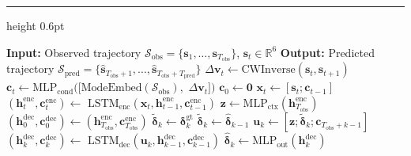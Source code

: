 \documentclass[a4paper,fleqn]{cas-dc}
\begin{document}
\noindent
\begin{minipage}{\columnwidth}
    \hrule height 0.6pt
    \vspace{3pt}
    \small
    \begin{algorithmic}[1]
        \State \textbf{Input:} Observed trajectory $\mathcal{S}_{\text{obs}} = \{\bm{s}_1, \dots, \bm{s}_{T_{\text{obs}}}\}$, $\bm{s}_t \in \mathbb{R}^{6}$
        \State \textbf{Output:} Predicted trajectory $\mathcal{S}_{\text{pred}} = \{\hat{\bm{s}}_{T_{\text{obs}}+1}, \dots, \hat{\bm{s}}_{T_{\text{obs}}+T_{\text{pred}}}\}$
        \State {}
        \State $\Delta\bm{v}_t \gets \text{CWInverse}(\bm{s}_t, \bm{s}_{t+1})$\label{alg:dv_est}
        \State $\bm{c}_t \gets \text{MLP}_{\text{cond}}([\text{ModeEmbed}(\mathcal{S}_{\text{obs}}),$
                        \Statex \hspace*{2em} $\Delta\bm{v}_t])$\label{alg:cond}
        \EndFor
        \State $\bm{c}_0 \gets \bm{0}$  
        \State {}
        \State $\bm{x}_t \gets [\bm{s}_t; \bm{c}_{t-1}]$\label{alg:ext_input}
        \State $(\bm{h}_t^{\text{enc}}, \bm{c}_t^{\text{enc}}) \gets$
        \Statex \hspace*{2em} $\text{LSTM}_{\text{enc}}(\bm{x}_t, \bm{h}_{t-1}^{\text{enc}}, \bm{c}_{t-1}^{\text{enc}})$\label{alg:encode}
        \EndFor
        \State $\bm{z} \gets \text{MLP}_{\text{ctx}}(\bm{h}_{T_{\text{obs}}}^{\text{enc}})$  
        \State $(\bm{h}_0^{\text{dec}}, \bm{c}_0^{\text{dec}}) \gets (\bm{h}_{T_{\text{obs}}}^{\text{enc}}, \bm{c}_{T_{\text{obs}}}^{\text{enc}})$
        \State {}
        \State $\tilde{\bm{\delta}}_k \gets \bm{\delta}_k^{\text{gt}}$\label{alg:teacher}
        \Else
        \State $\tilde{\bm{\delta}}_k \gets \hat{\bm{\delta}}_{k-1}$
        \EndIf
        \State $\bm{u}_k \gets [\bm{z}; \tilde{\bm{\delta}}_k; \bm{c}_{T_{\text{obs}}+k-1}]$\label{alg:dec_input}
        \State $(\bm{h}_k^{\text{dec}}, \bm{c}_k^{\text{dec}}) \gets$
        \Statex \hspace*{2em} $\text{LSTM}_{\text{dec}}(\bm{u}_k, \bm{h}_{k-1}^{\text{dec}}, \bm{c}_{k-1}^{\text{dec}})$
        \State $\hat{\bm{\delta}}_k \gets \text{MLP}_{\text{out}}(\bm{h}_k^{\text{dec}})$ \label{alg:delta}

\end{algorithmic}
\end{minipage}
\end{document}
